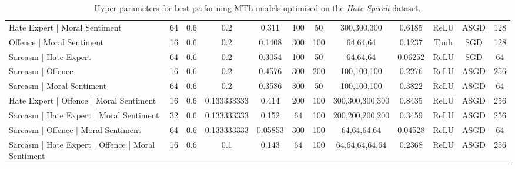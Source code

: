 {\begin{landscape}
\begin{table}[]
{\begin{tabular}{l|ccccccccccc}
      Hate Expert | Moral Sentiment                     & 64         & 0.6              & 0.2              & 0.311   & 100           & 50     & 300,300,300     & 0.6185        & ReLU          & ASGD      & 128        \\
      Offence | Moral Sentiment                         & 16         & 0.6              & 0.2              & 0.1408  & 300           & 100    & 64,64,64        & 0.1237        & Tanh          & SGD       & 128        \\
      Sarcasm | Hate Expert                             & 64         & 0.6              & 0.2              & 0.3054  & 100           & 50     & 64,64,64        & 0.06252       & ReLU          & SGD       & 64         \\
      Sarcasm | Offence                                 & 16         & 0.6              & 0.2              & 0.4576  & 300           & 200    & 100,100,100     & 0.2276        & ReLU          & ASGD      & 256        \\
      Sarcasm | Moral Sentiment                         & 64         & 0.6              & 0.2              & 0.3586  & 300           & 50     & 100,100,100     & 0.3822        & ReLU          & ASGD      & 64         \\
      Hate Expert  | Offence | Moral Sentiment          & 16         & 0.6              & 0.133333333      & 0.414   & 200           & 100    & 300,300,300,300 & 0.8435        & ReLU          & ASGD      & 256        \\
      Sarcasm | Hate Expert | Moral Sentiment           & 32         & 0.6              & 0.133333333      & 0.152   & 64            & 100    & 200,200,200,200 & 0.3459        & ReLU          & ASGD      & 256        \\
      Sarcasm | Offence | Moral Sentiment               & 64         & 0.6              & 0.133333333      & 0.05853 & 300           & 100    & 64,64,64,64     & 0.04528       & ReLU          & ASGD      & 64         \\
      Sarcasm | Hate Expert | Offence | Moral Sentiment & 16         & 0.6              & 0.1              & 0.143   & 64            & 100    & 64,64,64,64,64  & 0.2368        & ReLU          & ASGD      & 256
    \end{tabular}%
    }
    \caption{Hyper-parameters for best performing MTL models optimised on the \textit{Hate Speech} dataset.}
    \label{tab:mtl_params_wh}
  \end{table}
  \vfill
  \begin{table}[]

\end{table}
\end{landscape}}
